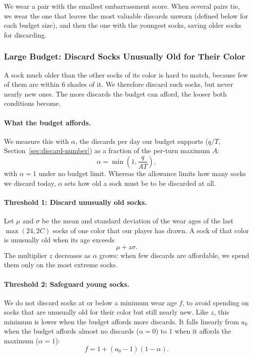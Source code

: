 \documentclass[11pt]{article}
\begin{document}
We wear a pair with the smallest embarrassment score. When several pairs tie, we wear the one that leaves the most valuable discards unworn (defined below for each budget size), and then the one with the youngest socks, saving older socks for discarding.

\subsubsection{Large Budget: Discard Socks Unusually Old for Their Color}
\label{sec:large-budget}

A sock much older than the other socks of its color is hard to match, because few of them are within 6 shades of it. We therefore discard such socks, but never nearly new ones. The more discards the budget can afford, the looser both conditions become.

\paragraph{What the budget affords.}
We measure this with \(\alpha\), the discards per day our budget supports (\(q/T\), Section~\ref{sec:discard-number}) as a fraction of the per-turn maximum \(A\):
\[
\alpha
=
\min\left(1,\frac{q}{AT}\right),
\]
with \(\alpha=1\) under no budget limit. Whereas the allowance limits how many socks we discard today, \(\alpha\) sets how old a sock must be to be discarded at all.

\paragraph{Threshold 1: Discard unusually old socks.}
Let \(\mu\) and \(\sigma\) be the mean and standard deviation of the wear ages of the last \(\max(24,2C)\) socks of one color that our player has drawn. A sock of that color is unusually old when its age exceeds
\[
\mu+z\sigma.
\]
The multiplier \(z\) decreases as \(\alpha\) grows: when few discards are affordable, we spend them only on the most extreme socks.

\paragraph{Threshold 2: Safeguard young socks.}
We do not discard socks at or below a minimum wear age \(f\), to avoid spending on socks that are unusually old for their color but still nearly new. Like \(z\), this minimum is lower when the budget affords more discards. It falls linearly from \(a_0\) when the budget affords almost no discards (\(\alpha=0\)) to \(1\) when it affords the maximum (\(\alpha=1\)):
\[
f
=
1+(a_0-1)(1-\alpha).
\]
\end{document}
